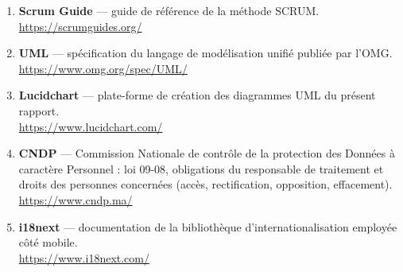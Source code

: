 \begin{enumerate}[leftmargin=1.1cm,itemsep=6pt]
  \item \textbf{Scrum Guide} --- guide de référence de la méthode SCRUM.
  \\ \url{https://scrumguides.org/}

  \item \textbf{UML} --- spécification du langage de modélisation unifié
  publiée par l'OMG.
  \\ \url{https://www.omg.org/spec/UML/}

  \item \textbf{Lucidchart} --- plate-forme de création des diagrammes UML du
  présent rapport.
  \\ \url{https://www.lucidchart.com/}

  \item \textbf{CNDP} --- Commission Nationale de contrôle de la protection des
  Données à caractère Personnel : loi 09-08, obligations du responsable de
  traitement et droits des personnes concernées (accès, rectification,
  opposition, effacement).
  \\ \url{https://www.cndp.ma/}

  \item \textbf{i18next} --- documentation de la bibliothèque
  d'internationalisation employée côté mobile.
  \\ \url{https://www.i18next.com/}

\end{enumerate}

